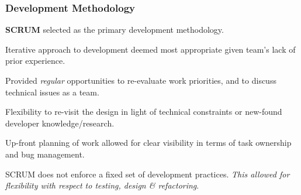 \documentclass[10pt, compress]{beamer}
\begin{document}
\begin{frame}[fragile]
  \frametitle{Development Methodology}
  
   \small{ 
   
   \textbf{SCRUM} selected as the primary development methodology.
   
   Iterative approach to development deemed most appropriate given team's lack of prior experience.
   
	
		\begin{itemize}
  			\footnotesize{
  			\item Provided \textit{regular} opportunities to re-evaluate work priorities, and to discuss technical issues as a team.
			\item Flexibility to re-visit the design in light of technical constraints or new-found developer knowledge/research.
  			}
  		\end{itemize}
  		
  	Up-front planning of work allowed for clear visibility in terms of task ownership and bug management.
  	
  	SCRUM does not enforce a fixed set of development practices. \textit{This allowed for flexibility with respect to testing, design \& refactoring}.  
  	
  	
	  
   }
   
\end{frame}
\end{document}
